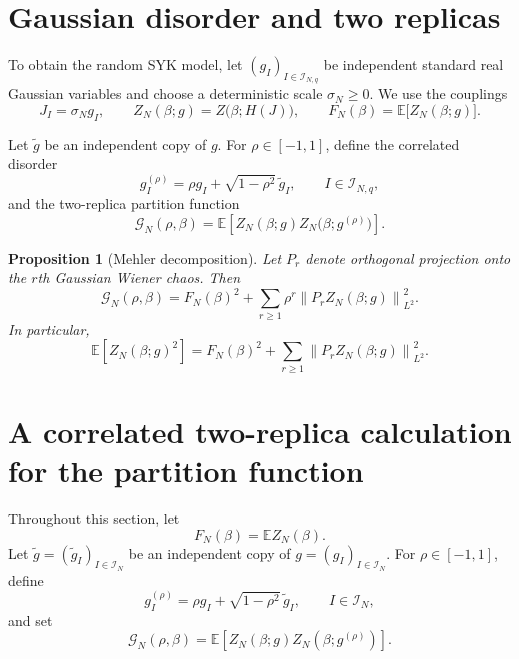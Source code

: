 \documentclass[11pt]{article}
\newtheorem{proposition}{Proposition}
\newcommand{\E}{\mathbb{E}}
\newcommand{\calI}{\mathcal{I}}
\begin{document}
\section{Gaussian disorder and two replicas}
\label{sec:two-replicas}

To obtain the random SYK model, let $(g_I)_{I\in\mathcal{I}_{N,q}}$ be
independent standard real Gaussian variables and choose a deterministic
scale $\sigma_N\geq0$. We use the couplings
\begin{equation}
  J_I=\sigma_N g_I,
  \qquad
  Z_N(\beta;g)=Z\bigl(\beta;H(J)\bigr),
  \qquad
  F_N(\beta)=\mathbb{E}\bigl[Z_N(\beta;g)\bigr].
\end{equation}

Let $\widetilde g$ be an independent copy of $g$. For
$\rho\in[-1,1]$, define the correlated disorder
\begin{equation}
  g_I^{(\rho)}
  =
  \rho g_I+\sqrt{1-\rho^2}\,\widetilde g_I,
  \qquad I\in\mathcal{I}_{N,q},
\end{equation}
and the two-replica partition function
\begin{equation}
  \mathcal{G}_N(\rho,\beta)
  =
  \mathbb{E}\left[
    Z_N(\beta;g)Z_N\bigl(\beta;g^{(\rho)}\bigr)
  \right].
\end{equation}

\begin{proposition}[Mehler decomposition]
  Let $P_r$ denote orthogonal projection onto the $r$th Gaussian Wiener
  chaos. Then
  \begin{equation}
    \mathcal{G}_N(\rho,\beta)
    =
    F_N(\beta)^2
    +
    \sum_{r\geq1}\rho^r
      \left\lVert P_r Z_N(\beta;g)\right\rVert_{L^2}^2.
  \end{equation}
  In particular,
  \begin{equation}
    \mathbb{E}\left[Z_N(\beta;g)^2\right]
    =
    F_N(\beta)^2
    +
    \sum_{r\geq1}
      \left\lVert P_r Z_N(\beta;g)\right\rVert_{L^2}^2.
  \end{equation}
\end{proposition}

\section{A correlated two-replica calculation for the partition function}
\label{sec:partition-function-second-moment}

Throughout this section, let
\begin{equation}\label{eq:annealed-partition-function}
  F_N(\beta)=\E Z_N(\beta).
\end{equation}
Let $\widetilde g=(\widetilde g_I)_{I\in\calI_N}$ be an independent copy of
$g=(g_I)_{I\in\calI_N}$.  For $\rho\in[-1,1]$, define
\begin{equation}\label{eq:rho-correlated-disorder}
  g_I^{(\rho)}
  =
  \rho g_I+\sqrt{1-\rho^2}\,\widetilde g_I,
  \qquad I\in\calI_N,
\end{equation}
and set
\begin{equation}\label{eq:rho-correlated-second-moment}
  \mathcal G_N(\rho,\beta)
  =
  \E\left[
    Z_N(\beta;g)Z_N(\beta;g^{(\rho)})
  \right].
\end{equation}
\end{document}
